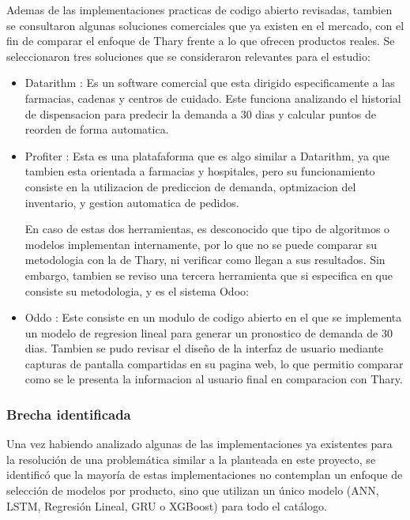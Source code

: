 Ademas de las implementaciones practicas de codigo abierto revisadas, tambien se consultaron algunas soluciones comerciales que ya existen en el mercado, con el fin de comparar el enfoque de Thary frente a lo que ofrecen productos reales. Se seleccionaron tres soluciones que se consideraron relevantes para el estudio:
\begin{itemize}
    \item Datarithm \cite{datarithm2024}: Es un software comercial que esta dirigido especificamente a las farmacias, cadenas y centros de cuidado. Este funciona analizando el historial de dispensacion para predecir la demanda a 30 dias y calcular puntos de reorden de forma automatica.
    
    \item Profiter \cite{profiter2024}: Esta es una platafaforma que es algo similar a Datarithm, ya que tambien esta orientada a farmacias y hospitales, pero su funcionamiento consiste en la utilizacion de prediccion de demanda, optmizacion del inventario, y gestion automatica de pedidos.

    En caso de estas dos herramientas, es desconocido que tipo de algoritmos o modelos implementan internamente, por lo que no se puede comparar su metodologia con la de Thary, ni verificar como llegan a sus resultados. Sin embargo, tambien se reviso una tercera herramienta que si especifica en que consiste su metodologia, y es el sistema Odoo:

    \item Oddo \cite{odoo_ai_dashboard}: Este consiste en un modulo de codigo abierto en el que se implementa un modelo de regresion lineal para generar un pronostico de demanda de 30 dias. Tambien se pudo revisar el diseño de la interfaz de usuario mediante capturas de pantalla compartidas en su pagina web, lo que permitio comparar como se le presenta la informacion al usuario final en comparacion con Thary.
\end{itemize}


\subsubsection{Brecha identificada}

Una vez habiendo analizado algunas de las implementaciones ya existentes para la resolución de una problemática similar a la planteada en este proyecto, se identificó que la mayoría de estas implementaciones no contemplan un enfoque de selección de modelos por producto, sino que utilizan un único modelo (ANN, LSTM, Regresión Lineal, GRU o XGBoost) para todo el catálogo.


